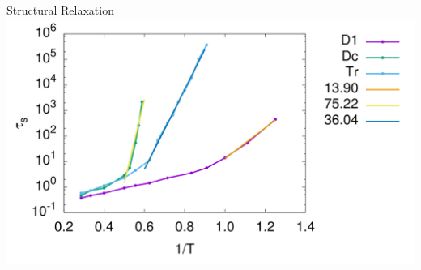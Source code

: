 \documentclass[16pt, aspectratio=43,compress]{beamer}
\begin{document}
\begin{frame}{Structural Relaxation}
    \centering
    \includegraphics[width=\textwidth]{ts}
\end{frame}
\end{document}
